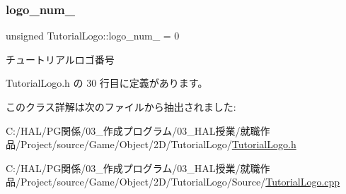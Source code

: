 \subsubsection{\texorpdfstring{logo\+\_\+num\+\_\+}{logo\_num\_}}
{\footnotesize\ttfamily unsigned Tutorial\+Logo\+::logo\+\_\+num\+\_\+ = 0\hspace{0.3cm}{\ttfamily [private]}}



チュートリアルロゴ番号 



 Tutorial\+Logo.\+h の 30 行目に定義があります。



このクラス詳解は次のファイルから抽出されました\+:\begin{DoxyCompactItemize}
\item 
C\+:/\+H\+A\+L/\+P\+G関係/03\+\_\+作成プログラム/03\+\_\+\+H\+A\+L授業/就職作品/\+Project/source/\+Game/\+Object/2\+D/\+Tutorial\+Logo/\mbox{\hyperlink{_tutorial_logo_8h}{Tutorial\+Logo.\+h}}\item 
C\+:/\+H\+A\+L/\+P\+G関係/03\+\_\+作成プログラム/03\+\_\+\+H\+A\+L授業/就職作品/\+Project/source/\+Game/\+Object/2\+D/\+Tutorial\+Logo/\+Source/\mbox{\hyperlink{_tutorial_logo_8cpp}{Tutorial\+Logo.\+cpp}}\end{DoxyCompactItemize}
